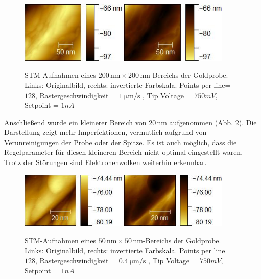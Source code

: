 \documentclass{article}
\begin{document}
\begin{figure}[h!]
    \centering
    \includegraphics[width=0.45\textwidth]{figure/Gold_mess_2.jpg}
    \hfill
    \includegraphics[width=0.45\textwidth]{figure/Gold_mess_inv.jpg}
    \caption{STM-Aufnahmen eines $200 \, \text{nm} \times 200 \, \text{nm}$-Bereichs der Goldprobe. Links: Originalbild, rechts: invertierte Farbskala. Points per line=$128$, Rastergeschwindigkeit = $ \SI{1}{\um \per \s}$ , Tip  Voltage = $750mV$, Setpoint = $1nA$}
    \label{fig:gold-probe}
\end{figure}
Anschließend wurde ein kleinerer Bereich von $20 \, \text{nm}$ aufgenommen (Abb. \ref{fig:gold-probeb}). Die Darstellung zeigt mehr Imperfektionen, vermutlich aufgrund von Verunreinigungen der Probe oder der Spitze. Es ist auch möglich, dass die Regelparameter für diesen kleineren Bereich nicht optimal eingestellt waren. Trotz der Störungen sind Elektronenwolken weiterhin erkennbar.

\begin{figure}[h!]
    \centering
    \includegraphics[width=0.45\textwidth]{figure/Gold_mess_3.jpg}
    \hfill
    \includegraphics[width=0.45\textwidth]{figure/Gold_mess_invb.jpg}
    \caption{STM-Aufnahmen eines $50 \, \text{nm} \times 50 \, \text{nm}$-Bereichs der Goldprobe. Links: Originalbild, rechts: invertierte Farbskala. Points per line=$128$, Rastergeschwindigkeit = $ \SI{0.4}{\um \per \s}$ , Tip  Voltage = $750mV$, Setpoint = $1nA$}
    \label{fig:gold-probeb}
\end{figure}
\end{document}
